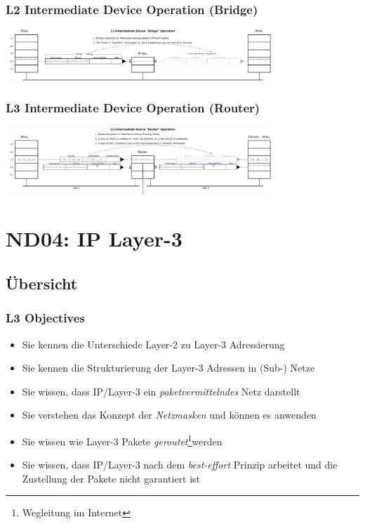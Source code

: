 \documentclass{beamer}
\begin{document}
\begin{frame}
\frametitle{L2 Intermediate Device Operation (Bridge)}
\includegraphics[width=10cm]{L2_intermediate-device}
\end{frame}

\begin{frame}
\frametitle{L3 Intermediate Device Operation (Router)}
\includegraphics[width=10cm]{L3_intermediate-device}
\end{frame}

\section{ND04: IP Layer-3}
\subsection{\"Ubersicht}

\begin{frame}
\frametitle{L3 Objectives}
\begin{itemize}
	\item{Sie kennen die Unterschiede Layer-2 zu Layer-3 Adressierung}
	\item{Sie kennen die Strukturierung der Layer-3 Adressen in (Sub-) Netze}
	\item{Sie wissen, dass IP/Layer-3 ein {\em paketvermittelndes} Netz darstellt}
	\item{Sie verstehen das Konzept der {\em Netzmasken} und k\"onnen es anwenden}
	\item{Sie wissen wie Layer-3 Pakete {\em geroutet}\footnote{Wegleitung im Internet}werden}
	\item{Sie wissen, dass IP/Layer-3 nach dem {\em best-effort} Prinzip arbeitet und die Zustellung der Pakete nicht garantiert ist}
\end{itemize}
\end{frame}
\end{document}
